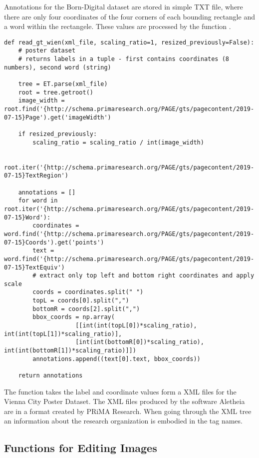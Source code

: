 Annotations for the Born-Digital dataset are stored in simple TXT file, where there are only four coordinates of the four corners of each bounding rectangle and a word within the rectangele. These values are processed by the function .

\begin{lstlisting}[caption=read\_gt\_wien]
def read_gt_wien(xml_file, scaling_ratio=1, resized_previously=False):
    # poster dataset
    # returns labels in a tuple - first contains coordinates (8 numbers), second word (string)

    tree = ET.parse(xml_file)
    root = tree.getroot()
    image_width = root.find('{http://schema.primaresearch.org/PAGE/gts/pagecontent/2019-07-15}Page').get('imageWidth')

    if resized_previously:
        scaling_ratio = scaling_ratio / int(image_width)

    root.iter('{http://schema.primaresearch.org/PAGE/gts/pagecontent/2019-07-15}TextRegion')

    annotations = []
    for word in root.iter('{http://schema.primaresearch.org/PAGE/gts/pagecontent/2019-07-15}Word'):
        coordinates = word.find('{http://schema.primaresearch.org/PAGE/gts/pagecontent/2019-07-15}Coords').get('points')
        text = word.find('{http://schema.primaresearch.org/PAGE/gts/pagecontent/2019-07-15}TextEquiv')
        # extract only top left and bottom right coordinates and apply scale
        coords = coordinates.split(" ")
        topL = coords[0].split(",")
        bottomR = coords[2].split(",")
        bbox_coords = np.array(
                    [[int(int(topL[0])*scaling_ratio), int(int(topL[1])*scaling_ratio)], 
                    [int(int(bottomR[0])*scaling_ratio), int(int(bottomR[1])*scaling_ratio)]])
        annotations.append((text[0].text, bbox_coords))

    return annotations
\end{lstlisting}

The function  takes the label and coordinate values form a XML files for the Vienna City Poster Dataset. The XML files produced by the software Aletheia are in a format created by PRiMA Research. When going through the XML tree an information about the research organization is embodied in the tag names.

\subsection*{Functions for Editing Images}

